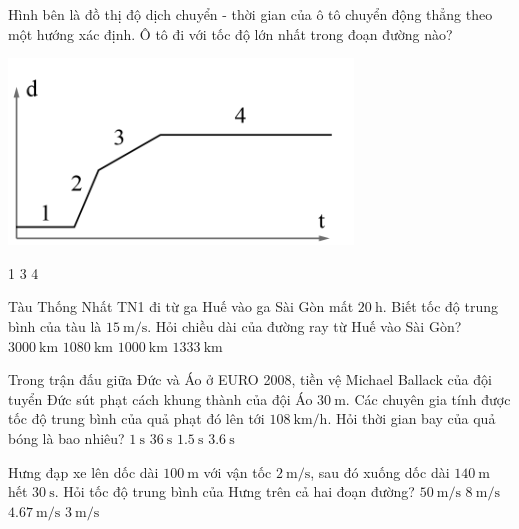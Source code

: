 \begin{ex}
	Hình bên là đồ thị độ dịch chuyển - thời gian của ô tô chuyển động thẳng theo một hướng xác định. Ô tô đi với tốc độ lớn nhất trong đoạn đường nào?
	\begin{center}
		\includegraphics[scale=0.6]{figs/G10Y25B5-3}
	\end{center}
	\choice
	{1}
	{}
	{3}
	{4}
	\loigiai{}
\end{ex}

\begin{ex}
	Tàu Thống Nhất TN1 đi từ ga Huế vào ga Sài Gòn mất $\SI{20}{\hour}$. Biết tốc độ trung bình của tàu là $\SI{15}{\meter/\second}$. Hỏi chiều dài của đường ray từ Huế vào Sài Gòn?
	\choice
	{$\SI{3000}{\kilo\meter}$}
	{\True $\SI{1080}{\kilo\meter}$}
	{$\SI{1000}{\kilo\meter}$}
	{$\SI{1333}{\kilo\meter}$}
\end{ex}

\begin{ex}
	Trong trận đấu giữa Đức và Áo ở EURO 2008, tiền vệ Michael Ballack của đội tuyển Đức sút phạt cách khung thành của đội Áo $\SI{30}{\meter}$. Các chuyên gia tính được tốc độ trung bình của quả phạt đó lên tới $\SI{108}{\kilo\meter/\hour}$. Hỏi thời gian bay của quả bóng là bao nhiêu?
	\choice
	{\True $\SI{1}{\second}$}
	{$\SI{36}{\second}$}
	{$\SI{1.5}{\second}$}
	{$\SI{3.6}{\second}$}
\end{ex}

\begin{ex}
	Hưng đạp xe lên dốc dài $\SI{100}{\meter}$ với vận tốc $\SI{2}{\meter/\second}$, sau đó xuống dốc dài $\SI{140}{\meter}$ hết $\SI{30}{\second}$. Hỏi tốc độ trung bình của Hưng trên cả hai đoạn đường?
	\choice
	{$\SI{50}{\meter/\second}$}
	{$\SI{8}{\meter/\second}$}
	{$\SI{4.67}{\meter/\second}$}
	{\True $\SI{3}{\meter/\second}$}
\end{ex}

